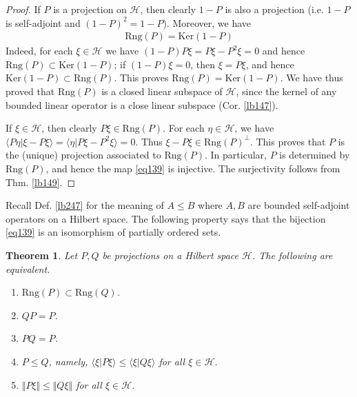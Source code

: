 \documentclass[12pt,b5paper,notitlepage]{article}
\theoremstyle{definition}
\theoremstyle{plain}
\newtheorem{thm}[df]{Theorem}
\newcommand{\mc}{\mathcal}
\newcommand{\bk}[1]{\langle {#1}\rangle}
\newcommand{\Ker}{\mathrm{Ker}}
\newcommand{\Rng}{\mathrm{Rng}}
\newcommand{\MH}{\mathcal H}
\numberwithin{equation}{section}
\begin{document}
\begin{proof}
If $P$ is a projection on $\MH$, then clearly $1-P$ is also a projection (i.e. $1-P$ is self-adjoint and $(1-P)^2=1-P$). Moreover, we have
\begin{align}\label{eq138}
\Rng(P)=\Ker(1-P)
\end{align}
Indeed, for each $\xi\in\MH$ we have $(1-P)P\xi=P\xi-P^2\xi=0$ and hence $\Rng(P)\subset\Ker(1-P)$; if $(1-P)\xi=0$, then $\xi=P\xi$, and hence $\Ker(1-P)\subset\Rng(P)$. This proves $\Rng(P)=\Ker(1-P)$. We have thus proved that $\Rng(P)$ is a closed linear subspace of $\MH$, since the kernel of any bounded linear operator is a close linear subspace (Cor. \ref{lb147}).

If $\xi\in\MH$, then clearly $P\xi\in\Rng(P)$. For each $\eta\in\MH$, we have $\bk{P\eta|\xi-P\xi}=\bk{\eta|P\xi-P^2\xi}=0$. Thus $\xi-P\xi\in\Rng(P)^\perp$. This proves that $P$ is the (unique) projection associated to $\Rng(P)$. In particular, $P$ is determined by $\Rng(P)$, and hence the map \eqref{eq139} is injective. The surjectivity follows from Thm. \ref{lb149}.
\end{proof}


Recall Def. \ref{lb247} for the meaning of $A\leq B$ where $A,B$ are bounded self-adjoint operators on a Hilbert space. The following property says that the bijection \eqref{eq139} is an isomorphism of partially ordered sets.


\begin{thm}\label{lb249}
Let $P,Q$ be projections on a Hilbert space $\MH$. The following are equivalent.
\begin{enumerate}[label=(\arabic*)]
\item[(1)] $\Rng(P)\subset \Rng(Q)$.
\item[(2)] $QP=P$.
\item[(2')] $PQ=P$. 
\item[(3)] $P\leq Q$, namely, $\bk{\xi|P\xi}\leq \bk{\xi|Q\xi}$ for all $\xi\in\mc H$.
\item[(3')] $\Vert P\xi\Vert\leq\Vert Q\xi\Vert$ for all $\xi\in\MH$.
\end{enumerate}
\end{thm}
\end{document}
